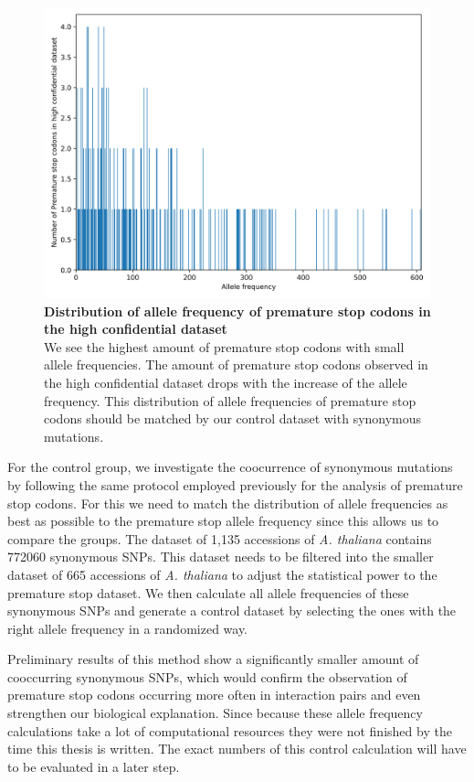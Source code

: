 \begin{figure}[tb]
  \centering
  \begin{minipage}[h]{0.9\textwidth}
    \centering
    \includegraphics[width=1.0\textwidth]{images/Allele_Frequency.png}
    \caption[Distribution of allele frequency of premature stop codons in the high confidential dataset]{\textbf{Distribution of allele frequency of premature stop codons in the high confidential dataset}\\
    We see the highest amount of premature stop codons with small allele frequencies. The amount of premature stop codons observed in the high confidential dataset drops with the increase of the allele frequency. This distribution of allele frequencies of premature stop codons should be matched by our control dataset with synonymous mutations.
    }
   \label{fig:Allele_Frequency}
  \end{minipage}
\end{figure} 

For the control group, we investigate the coocurrence of synonymous mutations by following the same protocol employed previously for the analysis of premature stop codons. For this we need to match the distribution of allele frequencies as best as possible to the premature stop allele frequency since this allows us to compare the groups. The dataset of 1,135 accessions of \textit{A. thaliana} contains 772060 synonymous SNPs. This dataset needs to be filtered into the smaller dataset of 665 accessions of \textit{A. thaliana} to adjust the statistical power to the premature stop dataset. We then calculate all allele frequencies of these synonymous SNPs and generate a control dataset by selecting the ones with the right allele frequency in a randomized way. 

Preliminary results of this method show a significantly smaller amount of cooccurring synonymous SNPs, which would confirm the observation of premature stop codons occurring more often in interaction pairs  and even strengthen our biological explanation. Since because these allele frequency calculations take a lot of computational resources they were not finished by the time this thesis is written. The exact numbers of this control calculation will have to be evaluated in a later step. 